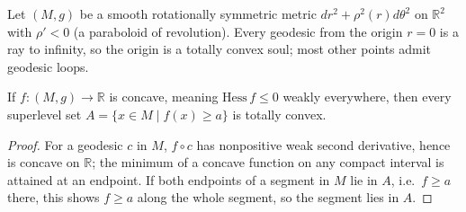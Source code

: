 \begin{example}
  \label{ex:pet-ch12-totally-convex-paraboloid}
  Let $(M,g)$ be a smooth rotationally symmetric metric
  $dr^2+\rho^2(r)d\theta^2$ on $\mathbb{R}^2$ with $\rho'<0$ (a paraboloid of
  revolution). Every geodesic from the origin $r=0$ is a ray to infinity, so the
  origin is a totally convex soul; most other points admit geodesic loops.
\end{example}

\begin{lemma}
  \label{lem:pet-ch12-concave-superlevel-convex}
  If $f:(M,g)\to\mathbb{R}$ is concave, meaning $\mathrm{Hess}\,f\le0$ weakly
  everywhere, then every superlevel set $A=\{x\in M\mid f(x)\ge a\}$ is totally
  convex.
\end{lemma}
\begin{proof}
  For a geodesic $c$ in $M$, $f\circ c$ has nonpositive weak second derivative,
  hence is concave on $\mathbb{R}$; the minimum of a concave function on any
  compact interval is attained at an endpoint. If both endpoints of a segment
  in $M$ lie in $A$, i.e.\ $f\ge a$ there, this shows $f\ge a$ along the whole
  segment, so the segment lies in $A$.
\end{proof}

